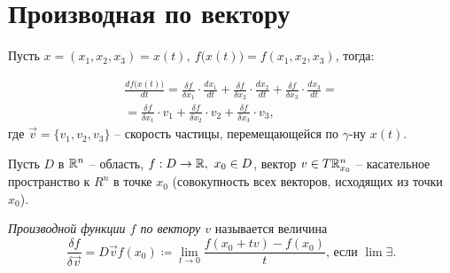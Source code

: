 

\section{Производная по вектору}

\begin{note}
    Пусть $ x = (x_1,x_2,x_3) = x(t), \ f\big(x(t)\big) = f(x_1,x_2,x_3)$, тогда:

    \begin{multline*}
        \frac{df\big(x(t)\big)}{dt} = \frac{\delta f}{\delta x_1} \cdot \frac{dx_1}{dt} + \frac{\delta f}{\delta x_2} \cdot \frac{dx_2}{dt} + \frac{\delta f}{\delta x_3} \cdot \frac{dx_3}{dt} = \\
        = \frac{\delta f}{\delta x_1} \cdot v_1 + \frac{\delta f}{\delta x_2} \cdot v_2 + \frac{\delta f}{\delta x_3} \cdot v_3,
    \end{multline*}
    где $\vec{v} = \{v_1,v_2,v_3\}$ -- скорость частицы, перемещающейся по $\gamma$-ну $x(t)$.
\end{note}

\begin{definition}
    Пусть $ D $ в $ \mathbb{R}^n $ -- область, $ f:D\rightarrow \mathbb{R}, \ x_0 \in D $, вектор $ v\in T\mathbb{R}_{x_0}^n $ -- касательное пространство к $ R^n $ в точке $ x_0 $ (совокупность всех векторов, исходящих из точки $ x_0 $).

    \emph{Производной функции $ f $ по вектору $ v $} называется величина
    \[
        \frac{\delta f}{\delta \vec{v}} = D \vec{v} f(x_0) \coloneqq \underset{t \rightarrow 0}{\lim}\frac{f(x_0 + tv) - f(x_0)}{t}\text{, если }\lim \exists.
    \]
\end{definition}

\newpage

